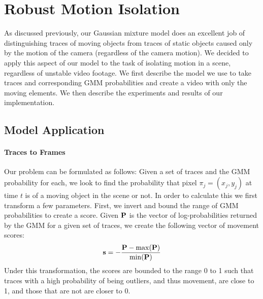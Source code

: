\section{Robust Motion Isolation} 

As discussed previously, our Gaussian mixture model does an excellent job of
distinguishing traces of moving objects from traces of static objects caused
only by the motion of the camera (regardless of the camera motion).  We decided
to apply this aspect of our model to the task of isolating motion in a scene,
regardless of unstable video footage.  We first describe the model we use to
take traces and corresponding GMM probabilities and create a video with only the
moving elements.  We then describe the experiments and results of our
implementation.

\subsection{Model Application} %
\label{sub:Model Application}

\paragraph{Traces to Frames} %
\label{par:Traces to Frames}

Our problem can be formulated as follows: Given a set of traces and the GMM
probability for each, we look to find the probability that pixel $\pi_j =
(x_j,y_j)$ at time $t$ is of a moving object in the scene or not.  In order to
calculate this we first transform a few parameters.  First, we invert and bound
the range of GMM probabilities to create a  score.  Given ${\bf
P}$ is the vector of log-probabilities returned by the GMM for a given set of
traces, we create the following vector of movement scores:
\begin{align}
	{\bf s} = - \frac{ {\bf P} - {\rm max}({\bf P}) }{ {\rm min}({\bf P}) }
\end{align}
Under this transformation, the scores are bounded to the range 0 to 1 such that
traces with a high probability of being outliers, and thus movement, are close
to 1, and those that are not are closer to 0.

